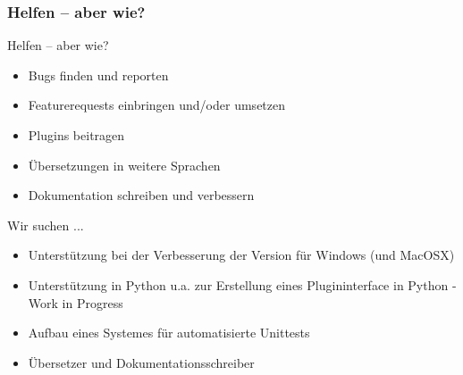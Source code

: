 \begin{frame}
	\frametitle{Helfen -- aber wie?}
	\begin{block}{Helfen -- aber wie?}
		\begin{itemize}
			\item Bugs finden und reporten
			\item Featurerequests einbringen und/oder umsetzen
			\item Plugins beitragen
			\item Übersetzungen in weitere Sprachen
			\item Dokumentation schreiben und verbessern
		\end{itemize}
	\end{block}
	\pause
	\begin{block}{Wir suchen ... }
		\begin{itemize}
			\item Unterstützung bei der Verbesserung der Version für
				  Windows (und MacOSX)
			\pause
			\item Unterstützung in Python u.a. zur Erstellung eines
				  Plugininterface in Python - Work in Progress
			\pause
			\item Aufbau eines Systemes für automatisierte Unittests
			\pause
			\item Übersetzer und Dokumentationsschreiber
		\end{itemize}
	\end{block}
\end{frame}
